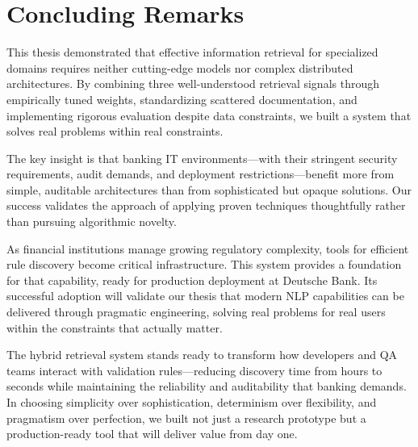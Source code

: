\section{Concluding Remarks}

This thesis demonstrated that effective information retrieval for specialized domains requires neither cutting-edge models nor complex distributed architectures. By combining three well-understood retrieval signals through empirically tuned weights, standardizing scattered documentation, and implementing rigorous evaluation despite data constraints, we built a system that solves real problems within real constraints.

The key insight is that banking IT environments—with their stringent security requirements, audit demands, and deployment restrictions—benefit more from simple, auditable architectures than from sophisticated but opaque solutions. Our success validates the approach of applying proven techniques thoughtfully rather than pursuing algorithmic novelty.

As financial institutions manage growing regulatory complexity, tools for efficient rule discovery become critical infrastructure. This system provides a foundation for that capability, ready for production deployment at Deutsche Bank. Its successful adoption will validate our thesis that modern NLP capabilities can be delivered through pragmatic engineering, solving real problems for real users within the constraints that actually matter.

The hybrid retrieval system stands ready to transform how developers and QA teams interact with validation rules—reducing discovery time from hours to seconds while maintaining the reliability and auditability that banking demands. In choosing simplicity over sophistication, determinism over flexibility, and pragmatism over perfection, we built not just a research prototype but a production-ready tool that will deliver value from day one.
